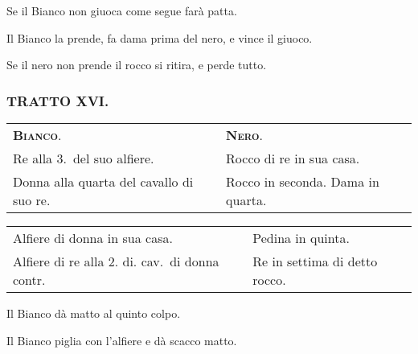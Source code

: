 \documentclass[11pt,a6paper]{article}
\begin{document}
Se il Bianco non giuoca come segue farà patta.


Il Bianco la prende, fa dama prima del nero, e vince il giuoco.

Se il nero non prende il rocco si ritira, e perde tutto.

\subsubsection{TRATTO XVI.}

{\small\noindent\begin{tabular}{@{}p{3.84cm}p{3.84cm}}
 {\bfseries\scshape Bianco}. & {\bfseries\scshape Nero}.\\
Re alla 3.\ del suo alfiere. & Rocco di re in sua casa. \\
Donna alla quarta del cavallo di suo re. & Rocco in seconda. Dama in quarta.\\
\end{tabular}

\noindent\begin{tabular}{@{}p{3.84cm}p{3.84cm}}
Alfiere di donna in sua casa. & Pedina in quinta.\\
Alfiere di re alla 2. di. cav.\ di donna contr. & Re in settima di detto rocco. \\
\end{tabular}}

Il Bianco dà matto al quinto colpo.


Il Bianco piglia con l'alfiere e dà scacco matto.
\end{document}
